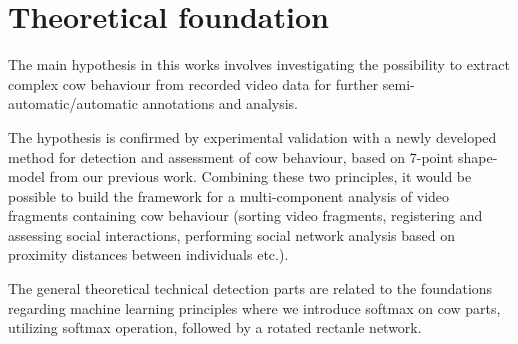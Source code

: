 \documentclass[10pt,a4paper]{article}
\begin{document}
\section{Theoretical foundation}

The main hypothesis in this works involves investigating the possibility to extract complex cow behaviour from recorded video data for further semi-automatic/automatic annotations and analysis. 

The hypothesis is confirmed by experimental validation with a newly developed method for detection and assessment of cow behaviour, based on 7-point shape-model \cite{guzhva2016feasibility} from our previous work. Combining these two principles, it would be possible to build the framework for a multi-component analysis of video fragments containing cow behaviour (sorting video fragments, registering and assessing social interactions, performing social network analysis based on proximity distances between individuals etc.).

The general theoretical technical detection parts are related to the foundations regarding machine learning principles where we introduce softmax on cow parts, utilizing softmax operation, followed by a rotated rectanle network.
\end{document}

